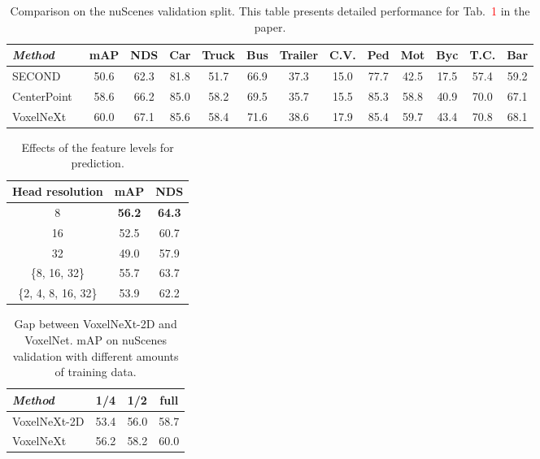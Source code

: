 \documentclass[10pt,twocolumn,letterpaper]{article}
\begin{document}
{\begin{table*}[t]
\begin{center}
\caption{Comparison on the nuScenes validation split. This table presents detailed performance for Tab.~\textcolor{red}{1} in the paper.}
\begin{tabular}{|l|cc|cccccccccc|}
\hline
                   {\em Method}                 & mAP   & NDS & Car                  & Truck                & Bus                  & Trailer              & C.V.                   & Ped                  & Mot                  & Byc                  & T.C.                   & Bar                   \\ \hline
SECOND~\cite{second}   &  50.6 & 62.3 & 81.8 & 51.7 & 66.9 & 37.3 & 15.0 & 77.7 & 42.5 & 17.5 & 57.4 & 59.2 \\
CenterPoint~\cite{centerpoint}  & 58.6 & 66.2 & 85.0 & 58.2 & 69.5 & 35.7 & 15.5 & 85.3 & 58.8 & 40.9 & 70.0 & 67.1 \\
VoxelNeXt    & 60.0 & 67.1 & 85.6 & 58.4 & 71.6 & 38.6 & 17.9 & 85.4 & 59.7 & 43.4 & 70.8 & 68.1 \\  \hline
\end{tabular}\label{tab:nuscenes-validation}
\end{center}
\end{table*}
\begin{table}[t]
\begin{center}
\caption{Effects of the feature levels for prediction.}
\begin{tabular}{|c|cc|}
\hline
Head resolution   &   mAP    & NDS  \\ \hline
 8 & \textbf{56.2} & \textbf{64.3} \\
16 & 52.5 & 60.7 \\
32 & 49.0 & 57.9 \\
\{8, 16, 32\} & 55.7 & 63.7 \\
\{2, 4, 8, 16, 32\} & 53.9 & 62.2 \\
\hline
\end{tabular}
\label{tab:nuscenes-output-downsamples-ablation}
\end{center}
\end{table}
\begin{table}[t]
\begin{center}
\caption{Gap between VoxelNeXt-2D and VoxelNet. mAP on nuScenes validation with different amounts of training data.}
\begin{tabular}{|l|ccc|}
\hline
{\em Method} & 1/4  & 1/2  & full \\ \hline
VoxelNeXt-2D & 53.4  & 56.0  & 58.7 \\ \hline
VoxelNeXt    & 56.2 & 58.2 & 60.0 \\ \hline
\end{tabular}\label{tab:analysis-data-amount}
\end{center}
\end{table}

}
\end{document}
